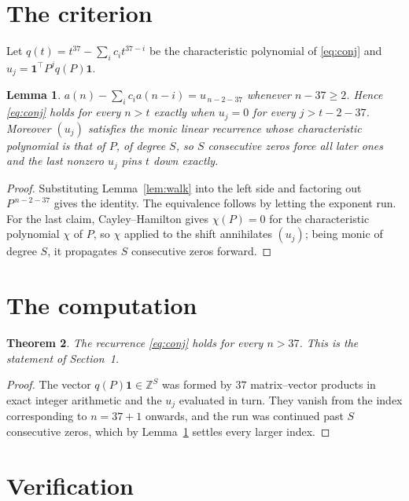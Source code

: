 \documentclass[11pt,a4paper]{article}
\theoremstyle{plain}
\newtheorem{theorem}{Theorem}
\newtheorem{lemma}[theorem]{Lemma}
\theoremstyle{definition}
\begin{document}
\section{The criterion}

Let $q(t)=t^{37}-\sum_i c_i t^{37-i}$ be the characteristic polynomial of
\eqref{eq:conj} and $u_j=\mathbf{1}^{\!\top}P^{j}q(P)\mathbf{1}$.

\begin{lemma}\label{lem:crit}
$a(n)-\sum_i c_i a(n-i)=u_{\,n-2-37}$ whenever $n-37\ge2$. Hence
\eqref{eq:conj} holds for every $n>t$ exactly when $u_j=0$ for every
$j>t-2-37$. Moreover $(u_j)$ satisfies the monic linear recurrence whose
characteristic polynomial is that of $P$, of degree $S$, so $S$ consecutive zeros force all
later ones and the last nonzero $u_j$ pins $t$ down exactly.
\end{lemma}

\begin{proof}
Substituting Lemma~\ref{lem:walk} into the left side and factoring out
$P^{\,n-2-37}$ gives the identity. The equivalence follows by letting the exponent
run. For the last claim, Cayley--Hamilton gives $\chi(P)=0$ for the characteristic
polynomial $\chi$ of $P$, so $\chi$ applied to the shift annihilates $(u_j)$; being monic of
degree $S$, it propagates $S$ consecutive zeros forward.
\end{proof}

\section{The computation}

\begin{theorem}
The recurrence \eqref{eq:conj} holds for every $n>37$. This is the statement of
Section~1.
\end{theorem}

\begin{proof}
The vector $q(P)\mathbf{1}\in\mathbb{Z}^{S}$ was formed by $37$ matrix--vector
products in exact integer arithmetic and the $u_j$ evaluated in turn. They vanish from the
index corresponding to $n=37+1$ onwards, and the run was continued past $S$ consecutive
zeros, which by Lemma~\ref{lem:crit} settles every larger index.
\end{proof}

\section{Verification}
\end{document}
